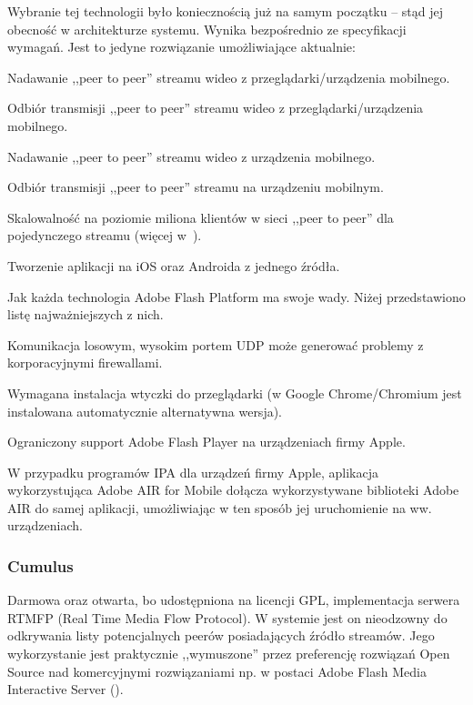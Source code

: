 Wybranie tej technologii było koniecznością już na samym początku -- stąd jej obecność w architekturze systemu. Wynika bezpośrednio ze specyfikacji wymagań. Jest to jedyne rozwiązanie umożliwiające aktualnie:
\begin{packed_item}
    \item{Nadawanie ,,peer to peer'' streamu wideo z przeglądarki/urządzenia mobilnego.}
    \item{Odbiór transmisji ,,peer to peer'' streamu wideo z przeglądarki/urządzenia mobilnego.}
    \item{Nadawanie ,,peer to peer'' streamu wideo z urządzenia mobilnego.}
    \item{Odbiór transmisji ,,peer to peer'' streamu na urządzeniu mobilnym.}
    \item{Skalowalność na poziomie miliona klientów w sieci ,,peer to peer'' dla pojedynczego streamu (więcej w~\cite{MattKauf2009}).}
    \item{Tworzenie aplikacji na iOS oraz Androida z jednego źródła.}
\end{packed_item}

Jak każda technologia Adobe Flash Platform ma swoje wady. Niżej przedstawiono listę najważniejszych z nich.
\begin{packed_item}
    \item{Komunikacja losowym, wysokim portem UDP może generować problemy z korporacyjnymi firewallami.}
    \item{Wymagana instalacja wtyczki do przeglądarki (w Google Chrome/Chromium jest instalowana automatycznie alternatywna wersja).}
    \item{Ograniczony support Adobe Flash Player na urządzeniach firmy Apple.}
    \item{W przypadku programów IPA dla urządzeń firmy Apple, aplikacja wykorzystująca Adobe AIR for Mobile dołącza wykorzystywane biblioteki Adobe AIR do samej aplikacji, umożliwiając w ten sposób jej uruchomienie na ww. urządzeniach.}
\end{packed_item}


\newpage
\subsubsection{Cumulus}
Darmowa oraz otwarta, bo udostępniona na licencji GPL, implementacja serwera RTMFP (Real Time Media Flow Protocol). W systemie jest on nieodzowny do odkrywania listy potencjalnych peerów posiadających źródło streamów. Jego wykorzystanie jest praktycznie ,,wymuszone'' przez preferencję rozwiązań Open Source nad komercyjnymi rozwiązaniami np. w postaci Adobe Flash Media Interactive Server (\cite{Cumulus}).

